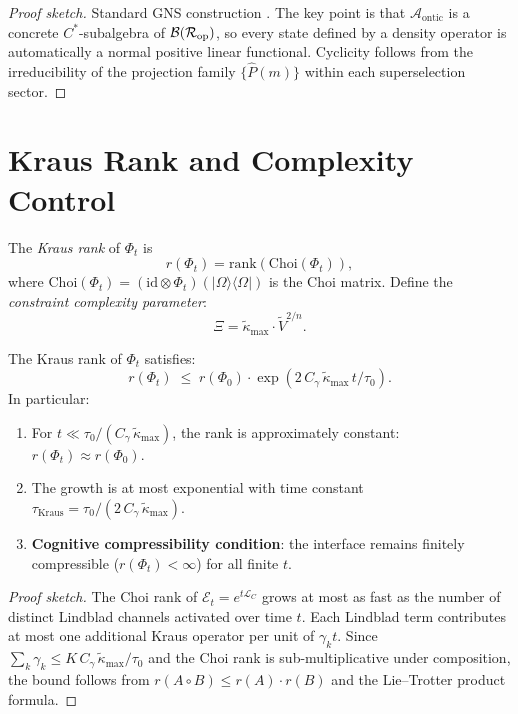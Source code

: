 \begin{proof}[Proof sketch]
Standard GNS construction \cite{BratteliRobinson1987}.  The key point
is that $\mathcal{A}_{\mathrm{ontic}}$ is a concrete $C^*$-subalgebra
of $\mathcal{B}(\mathcal{R}_{\mathrm{op}})$, so every state defined by a density
operator is automatically a normal positive linear functional.
Cyclicity follows from the irreducibility of the projection family
$\{\hat{P}(m)\}$ within each superselection sector.
\end{proof}

\section{Kraus Rank and Complexity Control}
\label{sec:kraus}

\begin{definition}\label{def:12.8}
The \emph{Kraus rank} of $\Phi_t$ is
\[
  r(\Phi_t) = \mathrm{rank}(\mathrm{Choi}(\Phi_t)),
\]
where $\mathrm{Choi}(\Phi_t) = (\mathrm{id} \otimes \Phi_t)(|\Omega\rangle\langle\Omega|)$
is the Choi matrix.  Define the \emph{constraint complexity parameter}:
\[
  \Xi = \tilde{\kappa}_{\max} \cdot \tilde{V}^{2/n}.
\]
\end{definition}

\begin{theorem}\label{thm:12.5}
The Kraus rank of $\Phi_t$ satisfies:
\begin{equation}\label{eq:kraus-bound}
  r(\Phi_t) \;\leq\; r(\Phi_0) \cdot \exp\!\left(
    2\,C_\gamma\,\tilde{\kappa}_{\max}\,t/\tau_0
  \right).
\end{equation}
In particular:
\begin{enumerate}
  \item For $t \ll \tau_0 / (C_\gamma\,\tilde{\kappa}_{\max})$, the rank
    is approximately constant: $r(\Phi_t) \approx r(\Phi_0)$.
  \item The growth is at most exponential with time constant
    $\tau_{\mathrm{Kraus}} = \tau_0 / (2\,C_\gamma\,\tilde{\kappa}_{\max})$.
  \item \textbf{Cognitive compressibility condition}: the interface remains
    finitely compressible ($r(\Phi_t) < \infty$) for all finite $t$.
\end{enumerate}
\end{theorem}

\begin{proof}[Proof sketch]
The Choi rank of $\mathcal{E}_t = e^{t\mathcal{L}_C}$ grows at most as
fast as the number of distinct Lindblad channels activated over time $t$.
Each Lindblad term contributes at most one additional Kraus operator per
unit of $\gamma_k t$.  Since $\sum_k \gamma_k \leq K\,C_\gamma\,\tilde{\kappa}_{\max}/\tau_0$
and the Choi rank is sub-multiplicative under composition, the bound
follows from $r(A \circ B) \leq r(A) \cdot r(B)$ and the Lie--Trotter
product formula.
\end{proof}

